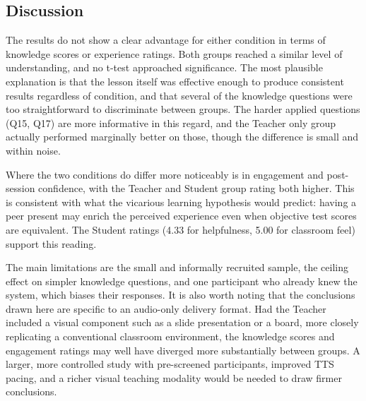 \subsection{Discussion}

The results do not show a clear advantage for either condition in terms of knowledge scores or experience ratings. Both groups reached a similar level of understanding, and no t-test approached significance. The most plausible explanation is that the lesson itself was effective enough to produce consistent results regardless of condition, and that several of the knowledge questions were too straightforward to discriminate between groups. The harder applied questions (Q15, Q17) are more informative in this regard, and the Teacher only group actually performed marginally better on those, though the difference is small and within noise.

Where the two conditions do differ more noticeably is in engagement and post-session confidence, with the Teacher and Student group rating both higher. This is consistent with what the vicarious learning hypothesis would predict: having a peer present may enrich the perceived experience even when objective test scores are equivalent. The Student ratings (4.33 for helpfulness, 5.00 for classroom feel) support this reading.

The main limitations are the small and informally recruited sample, the ceiling effect on simpler knowledge questions, and one participant who already knew the system, which biases their responses. It is also worth noting that the conclusions drawn here are specific to an audio-only delivery format. Had the Teacher included a visual component such as a slide presentation or a board, more closely replicating a conventional classroom environment, the knowledge scores and engagement ratings may well have diverged more substantially between groups. A larger, more controlled study with pre-screened participants, improved TTS pacing, and a richer visual teaching modality would be needed to draw firmer conclusions.

